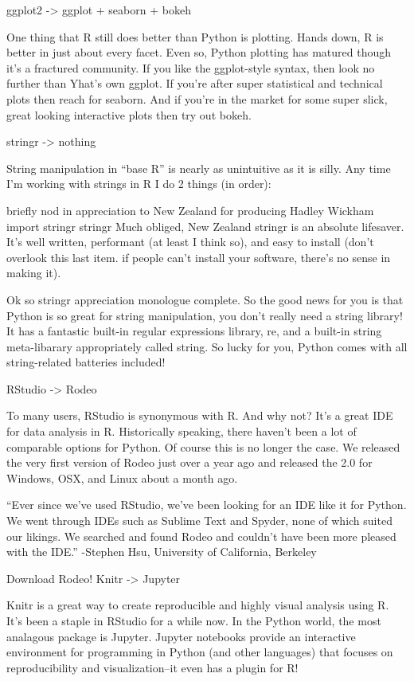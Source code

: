 \documentclass[]{book}
\begin{document}
ggplot2 -\textgreater{} ggplot + seaborn + bokeh

One thing that R still does better than Python is plotting. Hands down, R is better in just about every facet. Even so, Python plotting has matured though it's a fractured community. If you like the ggplot-style syntax, then look no further than Yhat's own ggplot. If you're after super statistical and technical plots then reach for seaborn. And if you're in the market for some super slick, great looking interactive plots then try out bokeh.

stringr -\textgreater{} nothing

String manipulation in ``base R'' is nearly as unintuitive as it is silly. Any time I'm working with strings in R I do 2 things (in order):

briefly nod in appreciation to New Zealand for producing Hadley Wickham
import stringr
stringr
Much obliged, New Zealand
stringr is an absolute lifesaver. It's well written, performant (at least I think so), and easy to install (don't overlook this last item. if people can't install your software, there's no sense in making it).

Ok so stringr appreciation monologue complete. So the good news for you is that Python is so great for string manipulation, you don't really need a string library! It has a fantastic built-in regular expressions library, re, and a built-in string meta-libarary appropriately called string. So lucky for you, Python comes with all string-related batteries included!

RStudio -\textgreater{} Rodeo

To many users, RStudio is synonymous with R. And why not? It's a great IDE for data analysis in R. Historically speaking, there haven't been a lot of comparable options for Python. Of course this is no longer the case. We released the very first version of Rodeo just over a year ago and released the 2.0 for Windows, OSX, and Linux about a month ago.

``Ever since we've used RStudio, we've been looking for an IDE like it for Python. We went through IDEs such as Sublime Text and Spyder, none of which suited our likings. We searched and found Rodeo and couldn't have been more pleased with the IDE.'' -Stephen Hsu, University of California, Berkeley

Download Rodeo!
Knitr -\textgreater{} Jupyter

Knitr is a great way to create reproducible and highly visual analysis using R. It's been a staple in RStudio for a while now. In the Python world, the most analagous package is Jupyter. Jupyter notebooks provide an interactive environment for programming in Python (and other languages) that focuses on reproducibility and visualization--it even has a plugin for R!
\end{document}
